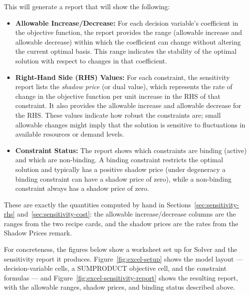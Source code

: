 \begin{center}
\par{}\label{fig:excel-sensitivity}%

\end{center}
This will generate a report that will show the following:
\begin{itemize}
\item \textbf{Allowable Increase/Decrease:} For each decision variable's coefficient in the objective function, the report provides the range (allowable increase and allowable decrease) within which the coefficient can change without altering the current optimal basis. This range indicates the stability of the optimal solution with respect to changes in that coefficient.

\item \textbf{Right-Hand Side (RHS) Values:} For each constraint, the sensitivity report lists the \emph{shadow price} (or dual value), which represents the rate of change in the objective function per unit increase in the RHS of that constraint. It also provides the allowable increase and allowable decrease for the RHS. These values indicate how robust the constraints are; small allowable changes might imply that the solution is sensitive to fluctuations in available resources or demand levels.

\item \textbf{Constraint Status:} The report shows which constraints are binding (active) and which are non-binding. A binding constraint restricts the optimal solution and typically has a positive shadow price (under degeneracy a binding constraint can have a shadow price of zero), while a non-binding constraint always has a shadow price of zero.
\end{itemize}

These are exactly the quantities computed by hand in Sections~\ref{sec:sensitivity-rhs} and~\ref{sec:sensitivity-cost}: the allowable increase/decrease columns are the ranges from the two recipe cards, and the shadow prices are the rates from the Shadow Prices remark.

For concreteness, the figures below show a worksheet set up for Solver and the
sensitivity report it produces. Figure~\ref{fig:excel-setup} shows the model
layout --- decision-variable cells, a SUMPRODUCT objective cell, and the
constraint formulas --- and Figure~\ref{fig:excel-sensitivity-report} shows the
resulting report, with the allowable ranges, shadow prices, and binding status
described above.

